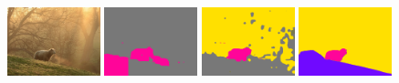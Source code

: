 \begin{figure}[htp]
  \centering
  \vspace{-0.5em}
 
  \hspace{3em}
  \hspace{1.5em}
  \hspace{1.5em}
  \vspace{-0.02em} %
  \vspace{-0.05em}
    
  {\includegraphics[width=0.24\textwidth]{figures/experiments/context/image/0027.jpg}}
  {\includegraphics[width=0.24\textwidth]{figures/experiments/context/orgckpt/0027.png}}
  {\includegraphics[width=0.24\textwidth]{figures/experiments/context/nonnoisy/0027.png}}
  {\includegraphics[width=0.24\textwidth]{figures/experiments/context/gt/2008_000084.png}}
    

\end{figure}
